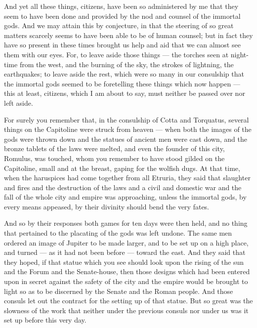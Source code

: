  And yet all these things, citizens, have been so administered by me that they seem to have been done and provided by the nod and counsel of the immortal gods. And we may attain this by conjecture, in that the steering of so great matters scarcely seems to have been able to be of human counsel; but in fact they have so present in these times brought us help and aid that we can almost see them with our eyes. For, to leave aside those things --- the torches seen at night-time from the west, and the burning of the sky, the strokes of lightning, the earthquakes; to leave aside the rest, which were so many in our consulship that the immortal gods seemed to be foretelling these things which now happen --- this at least, citizens, which I am about to say, must neither be passed over nor left aside.

 For surely you remember that, in the consulship of Cotta and Torquatus, several things on the Capitoline were struck from heaven --- when both the images of the gods were thrown down and the statues of ancient men were cast down, and the bronze tablets of the laws were melted, and even the founder of this city, Romulus, was touched, whom you remember to have stood gilded on the Capitoline, small and at the breast, gaping for the wolfish dugs. At that time, when the haruspices had come together from all Etruria, they said that slaughter and fires and the destruction of the laws and a civil and domestic war and the fall of the whole city and empire was approaching, unless the immortal gods, by every means appeased, by their divinity should bend the very fates.

 And so by their responses both games for ten days were then held, and no thing that pertained to the placating of the gods was left undone. The same men ordered an image of Jupiter to be made larger, and to be set up on a high place, and turned --- as it had not been before --- toward the east. And they said that they hoped, if that statue which you see should look upon the rising of the sun and the Forum and the Senate-house, then those designs which had been entered upon in secret against the safety of the city and the empire would be brought to light so as to be discerned by the Senate and the Roman people. And those consuls let out the contract for the setting up of that statue. But so great was the slowness of the work that neither under the previous consuls nor under us was it set up before this very day.

